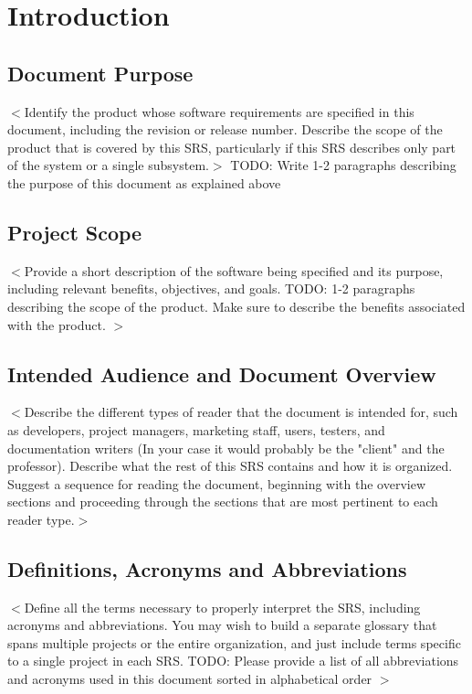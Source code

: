 \documentclass[a4paper, 11pt]{scrreprt}
\begin{document}
\clearpage
{}  %

\chapter{Introduction}
\section{Document Purpose}
$<$Identify the product whose software requirements are specified in this document, 
including the revision or release number. Describe the scope of the product that is 
covered by this SRS, particularly if this SRS describes only part of the system or a 
single subsystem.$>$
TODO: Write 1-2 paragraphs describing the purpose of this document as explained above

\section{Project Scope}
$<$Provide a short description of the software being specified and its purpose, including relevant benefits, objectives, and goals. 
TODO: 1-2 paragraphs describing the scope of the product. Make sure to describe the benefits associated with the product.
$>$

\section{Intended Audience and Document Overview}
$<$Describe the different types of reader that the document is intended for, such as developers, project managers, marketing staff, users, testers, and documentation writers (In your case it would probably be the "client" and the professor). Describe what the rest of this SRS contains and how it is organized. Suggest a sequence for reading the document, beginning with the overview sections and proceeding through the sections that are most pertinent to each reader type.$>$

\section{Definitions, Acronyms and Abbreviations}
$<$Define all the terms necessary to properly interpret the SRS, including acronyms and abbreviations. You may wish to build a separate glossary that spans multiple projects or the entire organization, and just include terms specific to a single project in each SRS.
TODO: Please provide a list of all abbreviations and acronyms used in this document sorted in alphabetical order
$>$
\end{document}
